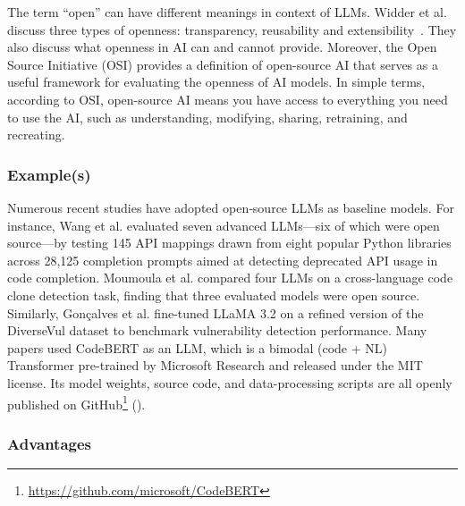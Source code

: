 The term ``open'' can have different meanings in context of LLMs.
Widder et al. discuss three types of openness: transparency, reusability and extensibility~\cite{widder2024open}.
They also discuss what openness in AI can and cannot provide.
Moreover, the Open Source Initiative (OSI) \cite{OSIAI2024} provides a definition of open-source AI that serves as a useful framework for evaluating the openness of AI models.
In simple terms, according to OSI, open-source AI means  you have access to everything you need to use the AI, such as understanding, modifying, sharing, retraining, and recreating.


\subsubsection{Example(s)}

Numerous recent studies have adopted open‐source LLMs as baseline models. For instance, Wang et al. \cite{wang2024and} evaluated seven advanced LLMs---six of which were open source---by testing 145 API mappings drawn from eight popular Python libraries across 28,125 completion prompts aimed at detecting deprecated API usage in code completion. Moumoula et al. \cite{moumoula2024large} compared four LLMs on a cross-language code clone detection task, finding that three evaluated models were open source. Similarly, Gonçalves et al. \cite{gonccalves2025evaluating} fine-tuned LLaMA 3.2 on a refined version of the DiverseVul dataset to benchmark vulnerability detection performance. Many papers \cite{DBLP:journals/jss/YangZCZHC23, DBLP:conf/gaiis/XiaSD24, DBLP:conf/kbse/SonnekalbGBM22, DBLP:conf/icse/CaiYMMN24} used CodeBERT as an LLM, which is a bimodal (code + NL) Transformer pre-trained by Microsoft Research and released under the MIT license. Its model weights, source code, and data-processing scripts are all openly published on GitHub\footnote{\url{https://github.com/microsoft/CodeBERT}} (\modelversion).


\subsubsection{Advantages}

